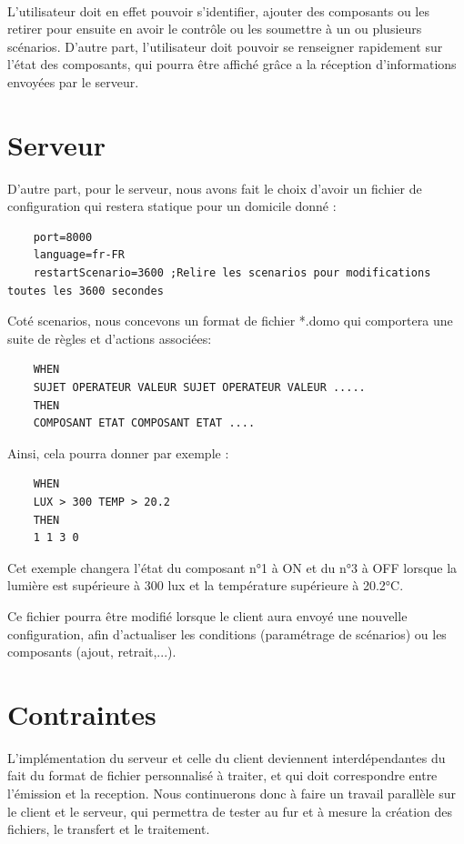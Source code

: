 \documentclass[12pt,a4paper]{article}
\begin{document}
  \\
  \newline
  L'utilisateur doit en effet pouvoir s'identifier, ajouter des composants ou les retirer pour ensuite en avoir le contrôle ou les soumettre à un ou plusieurs scénarios.
  D'autre part, l'utilisateur doit pouvoir se renseigner rapidement sur l'état des composants, qui pourra être affiché grâce a la réception d'informations envoyées par le serveur.

  \section*{Serveur}
  D'autre part, pour le serveur, nous avons fait le choix d'avoir un fichier de configuration qui restera statique pour un domicile donné :
  \begin{verbatim}
    port=8000
    language=fr-FR
    restartScenario=3600 ;Relire les scenarios pour modifications toutes les 3600 secondes
  \end{verbatim}
  Coté scenarios, nous concevons un format de fichier *.domo qui comportera une suite de règles et d'actions associées:
  \begin{verbatim}
    WHEN
    SUJET OPERATEUR VALEUR SUJET OPERATEUR VALEUR .....
    THEN
    COMPOSANT ETAT COMPOSANT ETAT ....
  \end{verbatim}

  Ainsi, cela pourra donner par exemple :
  \begin{verbatim}
    WHEN
    LUX > 300 TEMP > 20.2
    THEN
    1 1 3 0
  \end{verbatim}

  Cet exemple changera l'état du composant n°1 à ON et du n°3 à OFF lorsque la lumière est supérieure à 300 lux et la température supérieure à 20.2°C.

  Ce fichier pourra être modifié lorsque le client aura envoyé une nouvelle configuration, afin d'actualiser les conditions (paramétrage de scénarios) ou les composants (ajout, retrait,...).

\section*{Contraintes}
  L'implémentation du serveur et celle du client deviennent interdépendantes du fait du format de fichier personnalisé à traiter, et qui doit correspondre entre l'émission et la reception.
  Nous continuerons donc à faire un travail parallèle sur le client et le serveur, qui permettra de tester au fur et à mesure la création des fichiers, le transfert et le traitement.
\end{document}
